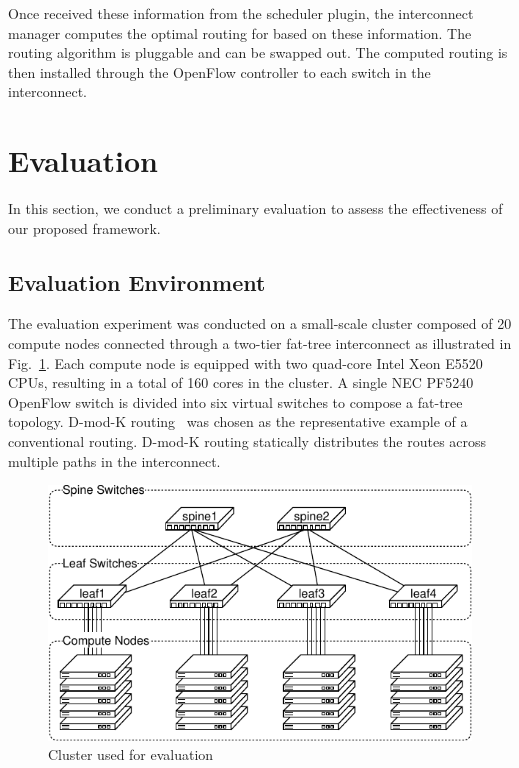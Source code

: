 \documentclass[graybox]{svmult}
\begin{document}
Once received these information from the scheduler plugin, the interconnect
manager computes the optimal routing for based on these information.
The routing algorithm is pluggable and can be swapped out. The computed
routing is then installed through the OpenFlow controller to each switch in
the interconnect.

\section{Evaluation}\label{kt:sec:iv}

In this section, we conduct a preliminary evaluation to assess the
effectiveness of our proposed framework.

\subsection{Evaluation Environment}

The evaluation experiment was conducted on a small-scale cluster composed of
20 compute nodes connected through a two-tier fat-tree interconnect as
illustrated in Fig.~\ref{kt:fig:cluster}. Each compute node is equipped with
two quad-core Intel Xeon E5520 CPUs, resulting in a total of 160 cores in the
cluster. A single NEC PF5240 OpenFlow switch is divided into six virtual
switches to compose a fat-tree topology. D-mod-K routing~\cite{Rodriguez2009}
was chosen as the representative example of a conventional routing. D-mod-K
routing statically distributes the routes across multiple paths in the
interconnect.

\begin{figure}
    \centering
    \includegraphics{evaluation_cluster}
    \caption{Cluster used for evaluation}%
    \label{kt:fig:cluster}
\end{figure}
\end{document}
